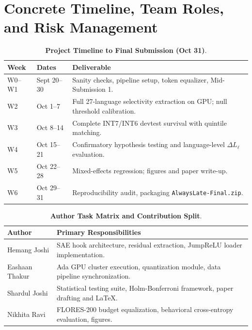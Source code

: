 \documentclass[11pt]{article}
\begin{document}
\section{Concrete Timeline, Team Roles, and Risk Management}

\begin{table}[h]
\centering
\small
\begin{tabularx}{\columnwidth}{llX}
\toprule
\textbf{Week} & \textbf{Dates} & \textbf{Deliverable} \\
\midrule
W0--W1 & Sept 20--30 & Sanity checks, pipeline setup, token equalizer, Mid-Submission 1. \\
W2 & Oct 1--7 & Full 27-language selectivity extraction on GPU; null threshold calibration. \\
W3 & Oct 8--14 & Complete INT7/INT6 devtest survival with quintile matching. \\
W4 & Oct 15--21 & Confirmatory hypothesis testing and language-level $\Delta L_\ell$ evaluation. \\
W5 & Oct 22--28 & Mixed-effects regression; figures and paper write-up. \\
W6 & Oct 29--31 & Reproducibility audit, packaging \texttt{AlwaysLate-Final.zip}. \\
\bottomrule
\end{tabularx}
\caption{\textbf{Project Timeline to Final Submission (Oct 31)}.}
\label{tab:timeline}
\end{table}

\begin{table}[h]
\centering
\small
\begin{tabularx}{\columnwidth}{lX}
\toprule
\textbf{Author} & \textbf{Primary Responsibilities} \\
\midrule
Hemang Joshi & SAE hook architecture, residual extraction, JumpReLU loader implementation. \\
Eashaan Thakur & Ada GPU cluster execution, quantization module, data pipeline synchronization. \\
Shardul Joshi & Statistical testing suite, Holm-Bonferroni framework, paper drafting and LaTeX. \\
Nikhita Ravi & FLORES-200 budget equalization, behavioral cross-entropy evaluation, figures. \\
\bottomrule
\end{tabularx}
\caption{\textbf{Author Task Matrix and Contribution Split}.}
\label{tab:authors}
\end{table}
\end{document}
